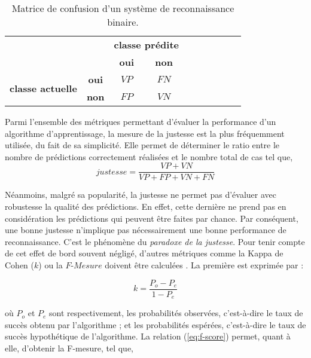 \begin{table}[H]
	\begin{center}
		\caption{Matrice de confusion d'un système de reconnaissance binaire.}
		\label{tab:conf_mat}
		\begin{tabular}{llllllllll}
			\cline{3-4}
			& \multicolumn{1}{l|}{} & \multicolumn{2}{c|}{\textbf{classe prédite}} \\ \cline{3-4}
	        & \multicolumn{1}{l|}{} & \multicolumn{1}{c|}{\textbf{oui}} & \multicolumn{1}{c|}{\textbf{non}} \\ \cline{1-4}
			\multicolumn{1}{|c|}{\multirow{2}{*}{\textbf{classe actuelle}}} & \multicolumn{1}{c|}{\textbf{oui}} & \multicolumn{1}{c|}{$VP$} & \multicolumn{1}{c|}{$FN$} \\ \cline{2-4}
			\multicolumn{1}{|c|}{} & \multicolumn{1}{c|}{\textbf{non}} & \multicolumn{1}{c|}{$FP$} & \multicolumn{1}{c|}{$VN$} \\ \cline{1-4}
		\end{tabular}
	\end{center}
\end{table}

Parmi l'ensemble des métriques permettant d'évaluer la performance d'un algorithme d'apprentissage, la mesure de la justesse est la plus fréquemment utilisée, du fait de sa simplicité. Elle permet de déterminer le ratio entre le nombre de prédictions correctement réalisées et le nombre total de cas tel que,
\begin{equation}
	justesse = \frac{VP+VN}{VP+FP+VN+FN}
\end{equation}

Néanmoins, malgré sa popularité, la justesse ne permet pas d'évaluer avec robustesse la qualité des prédictions. En effet, cette dernière ne prend pas en considération les prédictions qui peuvent être faites par chance. Par conséquent, une bonne justesse n'implique pas nécessairement une bonne performance de reconnaissance. C'est le phénomène du \textit{paradoxe de la justesse}. Pour tenir compte de cet effet de bord souvent négligé, d'autres métriques comme la Kappa de Cohen ($k$) ou la $F\mbox{-} Mesure$ doivent être calculées \citep{Ben-David2007a}. La première est exprimée par :

\begin{equation}
	\label{eq:kappa}
	k = \frac{P_o - P_e}{1 - P_e}
\end{equation}

\noindent où $P_o$ et $P_e$ sont respectivement, les probabilités observées, c'est-à-dire le taux de succès obtenu par l'algorithme ; et les probabilités espérées, c'est-à-dire le taux de succès hypothétique de l'algorithme. La relation (\ref{eq:f-score}) permet, quant à elle, d'obtenir la F-mesure, tel que,

